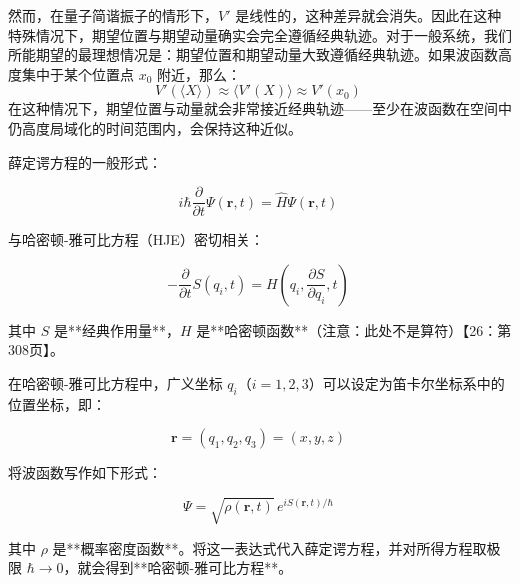 然而，在量子简谐振子的情形下，$V'$ 是线性的，这种差异就会消失。因此在这种特殊情况下，期望位置与期望动量确实会完全遵循经典轨迹。对于一般系统，我们所能期望的最理想情况是：期望位置和期望动量大致遵循经典轨迹。如果波函数高度集中于某个位置点 $x_0$ 附近，那么：
$$
V'\left( \langle X \rangle \right) \approx \langle V'(X) \rangle \approx V'(x_0)~
$$
在这种情况下，期望位置与动量就会非常接近经典轨迹——至少在波函数在空间中仍高度局域化的时间范围内，会保持这种近似。

薛定谔方程的一般形式：

$$
i\hbar \frac{\partial}{\partial t} \Psi(\mathbf{r}, t) = \hat{H} \Psi(\mathbf{r}, t)~
$$

与哈密顿-雅可比方程（HJE）密切相关：

$$
- \frac{\partial}{\partial t} S(q_i, t) = H\left(q_i, \frac{\partial S}{\partial q_i}, t\right)~
$$

其中 $S$ 是**经典作用量**，$H$ 是**哈密顿函数**（注意：此处不是算符）【26：第308页】。

在哈密顿-雅可比方程中，广义坐标 $q_i$（$i = 1, 2, 3$）可以设定为笛卡尔坐标系中的位置坐标，即：

$$
\mathbf{r} = (q_1, q_2, q_3) = (x, y, z)~
$$

将波函数写作如下形式：

$$
\Psi = \sqrt{\rho(\mathbf{r}, t)}\, e^{i S(\mathbf{r}, t) / \hbar}~
$$

其中 $\rho$ 是**概率密度函数**。将这一表达式代入薛定谔方程，并对所得方程取极限 $\hbar \to 0$，就会得到**哈密顿-雅可比方程**。
